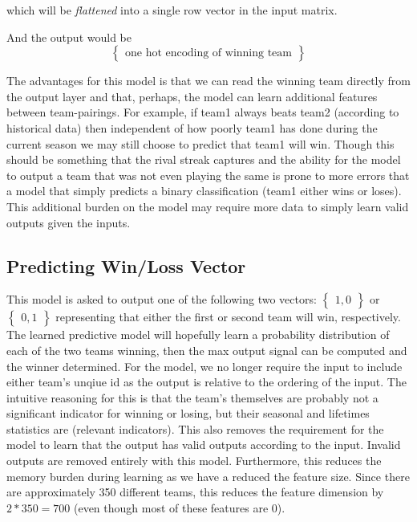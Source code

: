 \documentclass{article} %
\begin{document}
\begin{enumerate}
which will be \textit{flattened} into a single row vector in the input matrix.

And the output would be
\[
\begin{Bmatrix}
  \text{one hot encoding of winning team}
\end{Bmatrix}
\]


The advantages for this model is that we can read the winning team directly from the output layer and that, perhaps, the model can learn additional features between team-pairings.  For example, if team1 always beats team2 (according to historical data) then independent of how poorly team1 has done during the current season we may still choose to predict that team1 will win.  Though this should be something that the rival streak captures and the ability for the model to output a team that was not even playing the same is prone to more errors that a model that simply predicts a binary classification (team1 either wins or loses).  This additional burden on the model may require more data to simply learn valid outputs given the inputs.

\subsection{Predicting Win/Loss Vector}
\label{sec:architectures-winloss-vector}

This model is asked to output one of the following two vectors: $\begin{Bmatrix} 1, 0 \end{Bmatrix}$ or $\begin{Bmatrix} 0, 1 \end{Bmatrix}$ representing that either the first or second team will win, respectively.  The learned predictive model will hopefully learn a probability distribution of each of the two teams winning, then the max output signal can be computed and the winner determined.  For the model, we no longer require the input to include either team's unqiue id as the output is relative to the ordering of the input.  The intuitive reasoning for this is that the team's themselves are probably not a significant indicator for winning or losing, but their seasonal and lifetimes statistics are (relevant indicators).  This also removes the requirement for the model to learn that the output has valid outputs according to the input.  Invalid outputs are removed entirely with this model.  Furthermore, this reduces the memory burden during learning as we have a reduced the feature size.  Since there are approximately 350 different teams, this reduces the feature dimension by $2 * 350 = 700$ (even though most of these features are 0).


\end{enumerate}
\end{document}
